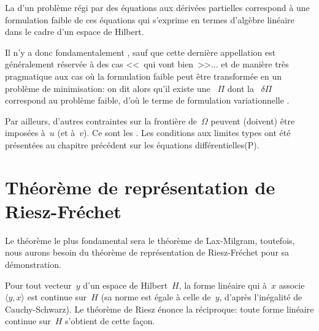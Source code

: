 \medskip
La  d'un problème régi par des équations aux dérivées partielles correspond
à une formulation faible de ces équations qui s'exprime en termes d'algèbre linéaire dans
le cadre d'un espace de Hilbert.

Il n'y a donc fondamentalement , sauf que cette dernière appellation est généralement réservée à
des cas <<~qui vont bien~>>... et de manière très pragmatique aux cas où
la formulation faible peut être transformée en un problème de minimisation:
on dit alors qu'il existe une ~$\Pi$ dont la
~$\delta\Pi$ correspond au problème faible, d'où
le terme de formulation variationnelle .

\medskip
Par ailleurs, d'autres contraintes sur la frontière de~$\Omega$ peuvent (doivent) être
imposées à~$u$ (et à~$v$). Ce sont les .
Les conditions aux limites types ont été présentées au chapitre précédent
sur les équations différentielles(P).

\medskip
\section{Théorème de représentation de Riesz-Fréchet}
Le théorème le plus fondamental sera le théorème de Lax-Milgram, toutefois,
nous aurons besoin du théorème de représentation de Riesz-Fréchet pour sa démonstration.

\medskip
Pour tout vecteur~$y$ d'un espace de Hilbert~$H$, la forme linéaire qui à~$x$ associe~$\langle y,x\rangle$
est continue sur~$H$ (sa norme est égale à celle de~$y$, d'après l'inégalité de Cauchy-Schwarz).
Le théorème de Riesz énonce la réciproque: toute forme linéaire continue sur~$H$ s'obtient de cette
façon.

